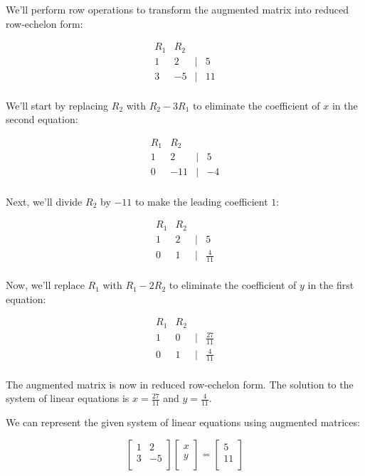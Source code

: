\documentclass[handout]{ximera}
\begin{document}
We'll perform row operations to transform the augmented matrix into reduced row-echelon form:

\[
\begin{array}{ccc|c}
R_1 & R_2 &  &  \\
\hline
1 & 2 & \vert & 5 \\
3 & -5 & \vert & 11 \\
\end{array}
\]

We'll start by replacing $R_2$ with $R_2 - 3R_1$ to eliminate the coefficient of $x$ in the second equation:

\[
\begin{array}{ccc|c}
R_1 & R_2 &  &  \\
\hline
1 & 2 & \vert & 5 \\
0 & -11 & \vert & -4 \\
\end{array}
\]

Next, we'll divide $R_2$ by $-11$ to make the leading coefficient $1$:

\[
\begin{array}{ccc|c}
R_1 & R_2 &  &  \\
\hline
1 & 2 & \vert & 5 \\
0 & 1 & \vert & \frac{4}{11} \\
\end{array}
\]

Now, we'll replace $R_1$ with $R_1 - 2R_2$ to eliminate the coefficient of $y$ in the first equation:

\[
\begin{array}{ccc|c}
R_1 & R_2 &  &  \\
\hline
1 & 0 & \vert & \frac{27}{11} \\
0 & 1 & \vert & \frac{4}{11} \\
\end{array}
\]

The augmented matrix is now in reduced row-echelon form. The solution to the system of linear equations is $x = \frac{27}{11}$ and $y = \frac{4}{11}$.



We can represent the given system of linear equations using augmented matrices:

\[
\begin{bmatrix}
1 & 2 \\
3 & -5 \\
\end{bmatrix}
\begin{bmatrix}
x \\
y \\
\end{bmatrix}
=
\begin{bmatrix}
5 \\
11 \\
\end{bmatrix}
\]
\end{document}
